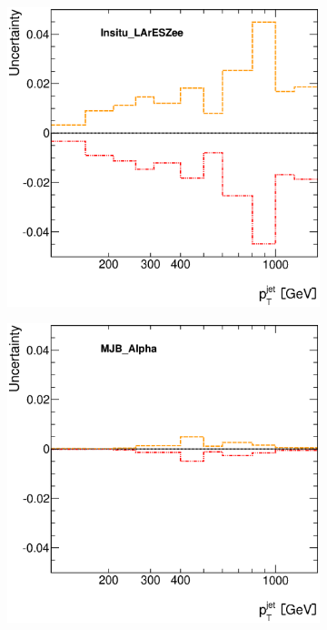 \documentclass[12pt, twoside]{article}
\numberwithin{equation}{section}
\numberwithin{figure}{section}
\newenvironment{changemargin}[2]{%
\begin{list}{}{%
\setlength{\topsep}{0pt}%
\setlength{\leftmargin}{#1}%
\setlength{\rightmargin}{#2}%
\setlength{\listparindent}{\parindent}%
\setlength{\itemindent}{\parindent}%
\setlength{\parsep}{\parskip}%
}%
\item[]}{\end{list}}
\begin{document}
\begin{figure}[H]
\begin{changemargin}{-1.0cm}{-0.75cm}
\begin{changemargin}{-0.75cm}{-1.0cm}
\begin{subfigure}[b]{0.25\textwidth}
            \includegraphics[width=\textwidth]{./images/JetSystematics/JetSystematic-22.eps}
        \end{subfigure}
        \begin{subfigure}[b]{0.25\textwidth}
            \includegraphics[width=\textwidth]{./images/JetSystematics/JetSystematic-23.eps}

\end{subfigure}
\end{changemargin}
\end{changemargin}
\end{figure}
\end{document}
